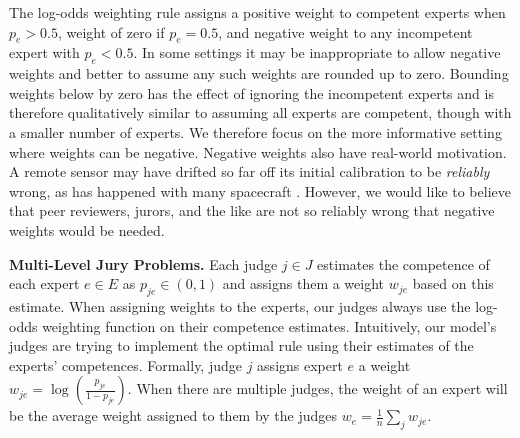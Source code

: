 \documentclass[letterpaper]{article} %
\newcommand{\judge}{\ensuremath{j} }
\newcommand{\judges}{\ensuremath{J} }
\newcommand{\experts}{\ensuremath{E} }
\newcommand{\expert}{\ensuremath{e} }
\begin{document}
The log-odds weighting rule assigns a positive weight to competent experts when $p_e > 0.5$, weight of zero if $p_\expert = 0.5$, and negative weight to any incompetent expert with $p_\expert < 0.5$. In some settings it may be inappropriate to allow negative weights and better to assume any such weights are rounded up to zero. Bounding weights below by zero has the effect of ignoring the incompetent experts and is therefore qualitatively similar to assuming all experts are competent, though with a smaller number of experts. We therefore focus on the more informative setting where weights can be negative. Negative weights also have real-world motivation. A remote sensor may have drifted so far off its initial calibration to be \emph{reliably} wrong, as has happened with many spacecraft \cite{bar2003effect}. However, we would like to believe that peer reviewers, jurors, and the like are not so reliably wrong that negative weights would be needed.


\vspace{0.2cm}
\noindent
\textbf{Multi-Level Jury Problems.\;}
Each judge $\judge \in \judges$ estimates the competence of each expert $\expert \in \experts$ as $p_{\judge \expert} \in (0,1)$ and assigns them a weight $w_{\judge\expert}$ based on this estimate.
%
When assigning weights to the experts, our judges always use the log-odds weighting function on their competence estimates.
%
Intuitively, our model's judges are trying to implement the optimal rule using their estimates of the experts' competences.
%
Formally, judge $\judge$ assigns expert $\expert$ a weight $w_{\judge\expert} = \log(\frac{p_{\judge\expert}}{1-p_{\judge\expert}})$.
%
When there are multiple judges, the weight of an expert will be the average weight assigned to them by the judges $w_\expert = \frac{1}{n} \sum\limits_{\judge} w_{\judge \expert}$.
%
\end{document}
